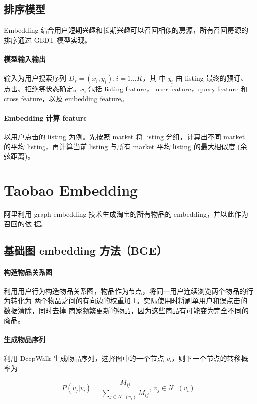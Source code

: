 \subsection{排序模型}
Embedding 结合用户短期兴趣和长期兴趣可以召回相似的房源，所有召回房源的排序通过
GBDT 模型实现。

\paragraph{模型输入输出} 输入为用户搜索序列 $D_s = (x_i, y_i), i=1 \ldots K$，其
中 $y_i$ 由 listing 最终的预订、点击、拒绝等状态确定。$x_i$ 包括 listing feature，
user feature，query feature 和 cross feature，以及 embedding feature。

\paragraph{Embedding 计算 feature} 以用户点击的 listing 为例。先按照 market 将
listing 分组，计算出不同 market 的平均 listing，再计算当前 listing 与所有 market
平均 listing 的最大相似度 (余弦距离)。

\section{Taobao Embedding}
阿里利用 graph embedding 技术生成淘宝的所有物品的 embedding，并以此作为召回的依
据。

\subsection{基础图 embedding 方法（BGE）}

\paragraph{构造物品关系图}
利用用户行为构造物品关系图，物品作为节点，将同一用户连续浏览两个物品的行为转化为
两个物品之间的有向边的权重加 1。实际使用时将刷单用户和误点击的数据清除，同时去掉
商家频繁更新的物品，因为这些商品有可能变为完全不同的商品。

\paragraph{生成物品序列}
利用 DeepWalk 生成物品序列，选择图中的一个节点 $v_i$，则下一个节点的转移概率为

\begin{equation}
  P(v_j | v_i) = \frac{M_{ij}}{\sum_{j \in N_{+}(v_i)} M_{ij}}, \, v_j \in N_{+}(v_i)
\end{equation}

